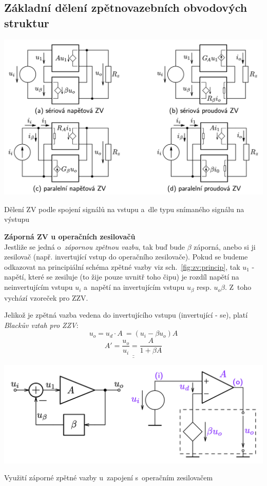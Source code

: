 \documentclass[a4paper,12pt]{article}   %
\begin{document}
\subsection*{Základní dělení zpětnovazebních obvodových struktur}

\begin{schema}[h!]
    \centering
    \includegraphics[width=.7\textwidth]{ZV-obvody.png}
    \caption{Dělení ZV podle spojení signálů na vstupu a~dle typu snímaného signálu na výstupu}
    \label{fig:ZV:deleni}
\end{schema}

\textbf{Záporná ZV u operačních zesilovačů}\\
Jestliže se jedná o~\textit{zápornou zpětnou vazbu}, tak buď bude $\beta$ záporná, anebo si ji  zesilovač (např. invertující vstup do operačního zesilovače). Pokud se budeme odkazovat na principiální schéma zpětné vazby viz sch.~\ref{fig:zv:princip}, tak $u_1$ - napětí, které se zesiluje (to žije pouze uvnitř toho čipu) je rozdíl napětí na neinvertujícím vstupu $u_i$ a~napětí na invertujícím vstupu $u_\beta$ resp. $u_o\beta$. Z~toho vychází vzoreček pro ZZV.

Jelikož je zpětná vazba vedena do invertujícího vstupu (invertující -  se), platí \textit{Blackův vztah pro ZZV}:
\begin{equation*}
    u_o = u_d\cdot A~= (u_i -\beta u_o) A
\end{equation*}
\begin{equation}
    \underline{\underline{A' = \frac{u_o}{u_i} = \frac{A}{1+\beta A}}}
    \label{eq:vysledne:zesileni}
\end{equation}

\begin{schema}[h!]
    \centering
    \includegraphics[width=.7\textwidth]{ZZV-OZ.png}
    \caption{Využití záporné zpětné vazby u~zapojení s~operačním zesilovačem}
    \label{fig:opamp:ZZV}
\end{schema}
\end{document}
